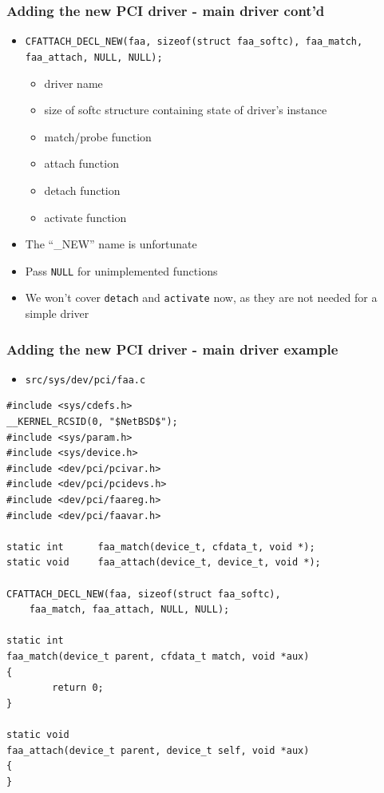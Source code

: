 \documentclass[dvipsnames,table]{beamer}
\begin{document}
\begin{frame}
\frametitle{Adding the new PCI driver - main driver cont'd}
\begin{itemize}
	\item {\tt CFATTACH\_DECL\_NEW(faa, sizeof(struct faa\_softc),
    faa\_match, faa\_attach, NULL, NULL);}
	\begin{itemize}
		\item driver name
		\item size of softc structure containing state of driver's instance
		\item match/probe function
		\item attach function
		\item detach function
		\item activate function
	\end{itemize}
	\item The ``\_NEW'' name is unfortunate
	\item Pass {\tt NULL} for unimplemented functions
	\item We won't cover {\tt detach} and {\tt activate} now, as they are not needed for a simple driver
\end{itemize}
\end{frame}

\begin{frame}[fragile]
\frametitle{Adding the new PCI driver - main driver example}
\scriptsize
\begin{itemize}
	\item {\tt src/sys/dev/pci/faa.c}
\end{itemize}
\begin{lstlisting}
#include <sys/cdefs.h>
__KERNEL_RCSID(0, "$NetBSD$");
#include <sys/param.h>
#include <sys/device.h>
#include <dev/pci/pcivar.h>
#include <dev/pci/pcidevs.h>
#include <dev/pci/faareg.h>
#include <dev/pci/faavar.h>

static int      faa_match(device_t, cfdata_t, void *);
static void     faa_attach(device_t, device_t, void *);

CFATTACH_DECL_NEW(faa, sizeof(struct faa_softc),
    faa_match, faa_attach, NULL, NULL);

static int
faa_match(device_t parent, cfdata_t match, void *aux)
{
        return 0;
}

static void
faa_attach(device_t parent, device_t self, void *aux)
{ 
}
\end{lstlisting}
\end{frame}
\end{document}
